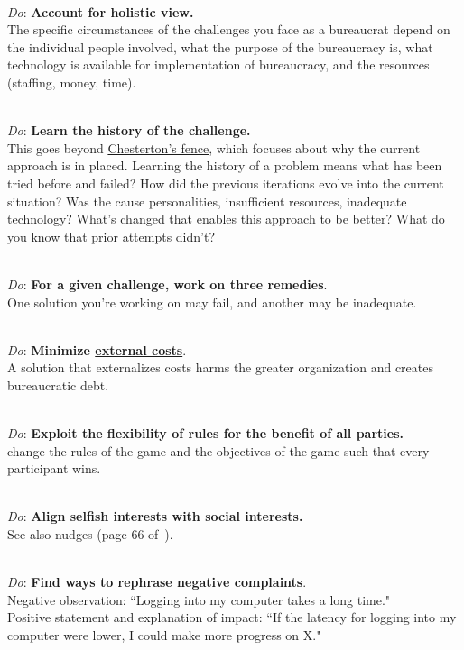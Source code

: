 \ \\
\textit{Do}: \textbf{Account for holistic view.}\\
The specific circumstances of the challenges you face as a bureaucrat depend on the individual people involved, what the purpose of the bureaucracy is, what technology is available for implementation of bureaucracy, and the resources (staffing, money, time). 

\ \\
\textit{Do}: \textbf{Learn the history of the challenge.}\\
This goes beyond \href{https://en.wikipedia.org/wiki/G._K._Chesterton#Chesterton's_fence}{Chesterton's fence}, which focuses about why the current approach is in placed. Learning the history of a problem means what has been tried before and failed? How did the previous iterations evolve into the current situation? Was the cause personalities, insufficient resources, inadequate technology? What's changed that enables this approach to be better? What do you know that prior attempts didn't?

\ \\
\textit{Do}: \textbf{For a given challenge, work on three remedies}.\\
One solution you're working on may fail, and another may be inadequate. 

\ \\
\textit{Do}: \textbf{Minimize \href{https://en.wikipedia.org/wiki/Externality}{external costs}}.\\
A solution that externalizes costs harms the greater organization and creates bureaucratic debt.

\ \\
\textit{Do}: \textbf{Exploit the flexibility of rules for the benefit of all parties.}\\
change the rules of the game and the objectives of the game such that every participant wins.

\ \\
\textit{Do}: \textbf{Align selfish interests with social interests.}\\
See also nudges
(page 66 of~\cite{2012_Schneier}).

\ \\
\textit{Do}: \textbf{Find ways to rephrase negative complaints}.\\
Negative observation: ``Logging into my computer takes a long time."\\
Positive statement and explanation of impact: ``If the latency for logging into my computer were lower, I could make more progress on X."


